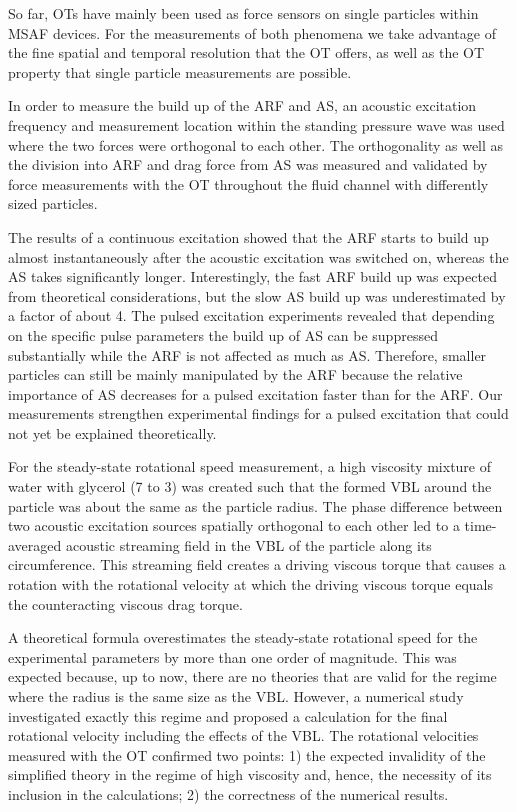 So far, OTs have mainly been used as force sensors on single particles within 
MSAF devices. For the measurements of both phenomena we take advantage of the 
fine spatial and temporal resolution that the OT offers, as well as the OT 
property that single particle measurements are possible.

In order to measure the build up of the ARF and AS, an acoustic excitation 
frequency and measurement location within the standing pressure wave was used 
where the two forces were orthogonal to each other. The orthogonality as well 
as the division into ARF and drag force from AS was measured and validated by 
force measurements with the OT throughout the fluid channel with differently 
sized particles.

The results of a continuous excitation showed that the ARF starts to build up 
almost instantaneously after the acoustic excitation was switched on, whereas 
the AS takes significantly longer. Interestingly, the fast ARF build up was 
expected from theoretical considerations, but the slow AS build up was 
underestimated by a factor of about 4. The pulsed excitation experiments 
revealed that depending on the specific pulse parameters the build up of AS can 
be suppressed substantially while the ARF is not affected as much as AS. 
Therefore, smaller particles can still be mainly manipulated by the ARF because 
the relative importance of AS decreases for a pulsed excitation faster than for 
the ARF. Our measurements strengthen experimental findings for a pulsed 
excitation that could not yet be explained theoretically.

For the steady-state rotational speed measurement, a high viscosity mixture of 
water with glycerol (7 to 3) was created such that the formed VBL around the 
particle was about the same as the particle radius. The phase difference 
between two acoustic excitation sources spatially orthogonal to each other led 
to a time-averaged acoustic streaming field in the VBL of the particle along 
its circumference. This streaming field creates a driving viscous torque that 
causes a rotation with the rotational velocity at which the driving viscous 
torque equals the counteracting viscous drag torque.

A theoretical formula overestimates the steady-state rotational speed for the 
experimental parameters by more than one order of magnitude. This was expected 
because, up to now, there are no theories that are valid for the regime where 
the radius is the same size as the VBL. However, a numerical study investigated 
exactly this regime and proposed a calculation for the final rotational 
velocity including the effects of the VBL. The rotational velocities measured 
with the OT confirmed two points: 1) the expected invalidity of the simplified 
theory in the regime of high viscosity and, hence, the necessity of its 
inclusion in the calculations; 2) the correctness of the numerical results.

